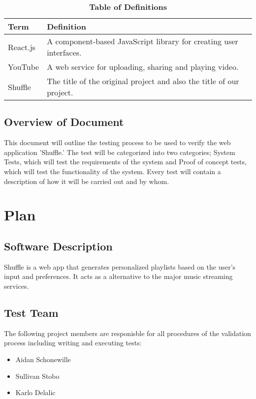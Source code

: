 \documentclass[12pt, titlepage]{article}
\begin{document}
\begin{table}[!htbp]
\caption{\textbf{Table of Definitions}} \label{Table}

\begin{tabularx}{\textwidth}{p{3cm}X}
\toprule
\textbf{Term} & \textbf{Definition}\\
\midrule
React.js & A component-based JavaScript library for creating user interfaces.\\
YouTube & A web service for uploading, sharing and playing video.\\
Shuffle & The title of the original project and also the title of our project.\\
\bottomrule
\end{tabularx}

\end{table}	

\subsection{Overview of Document}
\color{red}This document will outline the testing process to be used to verify the web application 'Shuffle.'  The test will be categorized into two categories; System Tests, which will test the requirements of the system and Proof of concept tests, which will test the functionality of the system.  Every test will contain a description of how it will be carried out and by whom.\color{black}

\section{Plan}
	
\subsection{Software Description}
Shuffle is a web app that generates personalized playlists based on the user’s input and
preferences. It acts as a alternative to the major music streaming services.

\subsection{Test Team}
The following project members are responisble for all procedures of the validation process including writing and executing tests:
\begin{itemize}
\item Aidan Schonewille
\item Sullivan Stobo
\item Karlo Delalic
\end{itemize}
\end{document}
